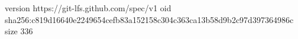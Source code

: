 version https://git-lfs.github.com/spec/v1
oid sha256:c819d16640e2249654cefb83a152158c304c363ca13b58d9b2c97d397364986c
size 336
